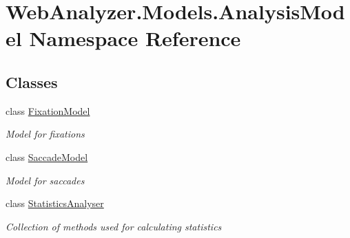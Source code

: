 \hypertarget{namespace_web_analyzer_1_1_models_1_1_analysis_model}{}\section{Web\+Analyzer.\+Models.\+Analysis\+Model Namespace Reference}
\label{namespace_web_analyzer_1_1_models_1_1_analysis_model}
\subsection*{Classes}
\begin{DoxyCompactItemize}
\item 
class \hyperlink{class_web_analyzer_1_1_models_1_1_analysis_model_1_1_fixation_model}{Fixation\+Model}
\begin{DoxyCompactList}\small\item\em Model for fixations \end{DoxyCompactList}\item 
class \hyperlink{class_web_analyzer_1_1_models_1_1_analysis_model_1_1_saccade_model}{Saccade\+Model}
\begin{DoxyCompactList}\small\item\em Model for saccades \end{DoxyCompactList}\item 
class \hyperlink{class_web_analyzer_1_1_models_1_1_analysis_model_1_1_statistics_analyser}{Statistics\+Analyser}
\begin{DoxyCompactList}\small\item\em Collection of methods used for calculating statistics \end{DoxyCompactList}\end{DoxyCompactItemize}
